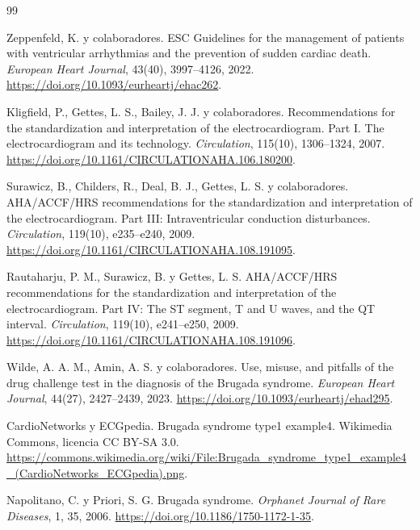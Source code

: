 \cleardoublepage
\begin{thebibliography}{99}

Zeppenfeld, K. y colaboradores.
 ESC Guidelines for the management of patients with ventricular arrhythmias and the prevention of sudden cardiac death.
\newblock \emph{European Heart Journal}, 43(40), 3997--4126, 2022.
\newblock \url{https://doi.org/10.1093/eurheartj/ehac262}.

Kligfield, P., Gettes, L. S., Bailey, J. J. y colaboradores.
\newblock Recommendations for the standardization and interpretation of the electrocardiogram. Part I. The electrocardiogram and its technology.
\newblock \emph{Circulation}, 115(10), 1306--1324, 2007.
\newblock \url{https://doi.org/10.1161/CIRCULATIONAHA.106.180200}.

Surawicz, B., Childers, R., Deal, B. J., Gettes, L. S. y colaboradores.
\newblock AHA/ACCF/HRS recommendations for the standardization and interpretation of the electrocardiogram. Part III: Intraventricular conduction disturbances.
\newblock \emph{Circulation}, 119(10), e235--e240, 2009.
\newblock \url{https://doi.org/10.1161/CIRCULATIONAHA.108.191095}.

Rautaharju, P. M., Surawicz, B. y Gettes, L. S.
\newblock AHA/ACCF/HRS recommendations for the standardization and interpretation of the electrocardiogram. Part IV: The ST segment, T and U waves, and the QT interval.
\newblock \emph{Circulation}, 119(10), e241--e250, 2009.
\newblock \url{https://doi.org/10.1161/CIRCULATIONAHA.108.191096}.

Wilde, A. A. M., Amin, A. S. y colaboradores.
\newblock Use, misuse, and pitfalls of the drug challenge test in the diagnosis of the Brugada syndrome.
\newblock \emph{European Heart Journal}, 44(27), 2427--2439, 2023.
\newblock \url{https://doi.org/10.1093/eurheartj/ehad295}.

CardioNetworks y ECGpedia.
\newblock Brugada syndrome type1 example4.
\newblock Wikimedia Commons, licencia CC BY-SA 3.0.
\newblock \url{https://commons.wikimedia.org/wiki/File:Brugada_syndrome_type1_example4_(CardioNetworks_ECGpedia).png}.

Napolitano, C. y Priori, S. G.
\newblock Brugada syndrome.
\newblock \emph{Orphanet Journal of Rare Diseases}, 1, 35, 2006.
\newblock \url{https://doi.org/10.1186/1750-1172-1-35}.


\end{thebibliography}
